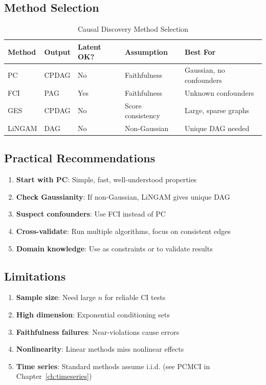 \subsection{Method Selection}

\begin{table}[h]
\centering
\caption{Causal Discovery Method Selection}
\begin{tabular}{lllll}
\toprule
Method & Output & Latent OK? & Assumption & Best For \\
\midrule
PC & CPDAG & No & Faithfulness & Gaussian, no confounders \\
FCI & PAG & Yes & Faithfulness & Unknown confounders \\
GES & CPDAG & No & Score consistency & Large, sparse graphs \\
LiNGAM & DAG & No & Non-Gaussian & Unique DAG needed \\
\bottomrule
\end{tabular}
\end{table}

\subsection{Practical Recommendations}

\begin{enumerate}
    \item \textbf{Start with PC}: Simple, fast, well-understood properties
    \item \textbf{Check Gaussianity}: If non-Gaussian, LiNGAM gives unique DAG
    \item \textbf{Suspect confounders}: Use FCI instead of PC
    \item \textbf{Cross-validate}: Run multiple algorithms, focus on consistent edges
    \item \textbf{Domain knowledge}: Use as constraints or to validate results
\end{enumerate}

\subsection{Limitations}

\begin{enumerate}
    \item \textbf{Sample size}: Need large $n$ for reliable CI tests
    \item \textbf{High dimension}: Exponential conditioning sets
    \item \textbf{Faithfulness failures}: Near-violations cause errors
    \item \textbf{Nonlinearity}: Linear methods miss nonlinear effects
    \item \textbf{Time series}: Standard methods assume i.i.d. (see PCMCI in Chapter~\ref{ch:timeseries})
\end{enumerate}

